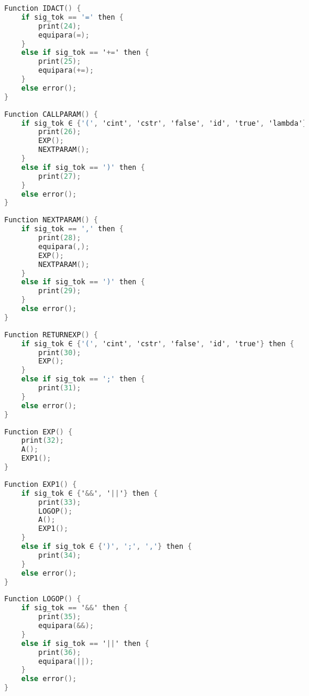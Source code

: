 \begin{lstlisting}[language=C, caption={ASS}]
Function IDACT() {
    if sig_tok == '=' then {
        print(24);
        equipara(=);
    }
    else if sig_tok == '+=' then {
        print(25);
        equipara(+=);
    }
    else error();
}
\end{lstlisting}

\begin{lstlisting}[language=C, caption={CALLPARAM}]
Function CALLPARAM() {
    if sig_tok ∈ {'(', 'cint', 'cstr', 'false', 'id', 'true', 'lambda'} then {
        print(26);
        EXP();
        NEXTPARAM();
    }
    else if sig_tok == ')' then {
        print(27);
    }
    else error();
}
\end{lstlisting}

\begin{lstlisting}[language=C, caption={NEXTPARAM}]
Function NEXTPARAM() {
    if sig_tok == ',' then {
        print(28);
        equipara(,);
        EXP();
        NEXTPARAM();
    }
    else if sig_tok == ')' then {
        print(29);
    }
    else error();
}
\end{lstlisting}

\begin{lstlisting}[language=C, caption={RETURNEXP}]
Function RETURNEXP() {
    if sig_tok ∈ {'(', 'cint', 'cstr', 'false', 'id', 'true'} then {
        print(30);
        EXP();
    }
    else if sig_tok == ';' then {
        print(31);
    }
    else error();
}
\end{lstlisting}

\begin{lstlisting}[language=C, caption={EXP}]
Function EXP() {
    print(32);
    A();
    EXP1();
}
\end{lstlisting}

\begin{lstlisting}[language=C, caption={EXP1}]
Function EXP1() {
    if sig_tok ∈ {'&&', '||'} then {
        print(33);
        LOGOP();
        A();
        EXP1();
    }
    else if sig_tok ∈ {')', ';', ','} then {
        print(34);
    }
    else error();
}
\end{lstlisting}

\begin{lstlisting}[language=C, caption={LOGOP}]
Function LOGOP() {
    if sig_tok == '&&' then {
        print(35);
        equipara(&&);
    }
    else if sig_tok == '||' then {
        print(36);
        equipara(||);
    }
    else error();
}
\end{lstlisting}

